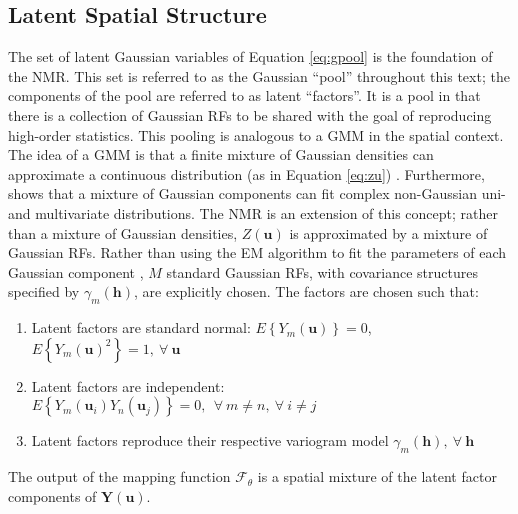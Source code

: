 

\FloatBarrier
\subsection{Latent Spatial Structure}
\label{subsec:03latent}

The set of latent Gaussian variables of Equation \ref{eq:gpool} is the foundation of the \gls{NMR}. This set is referred to as the Gaussian ``pool'' throughout this text; the components of the pool are referred to as latent ``factors''. It is a pool in that there is a collection of Gaussian \glspl{RF} to be shared with the goal of reproducing high-order statistics. This pooling is analogous to a \gls{GMM} in the spatial context. The idea of a \gls{GMM} is that a finite mixture of Gaussian densities can approximate a continuous distribution (as in Equation \ref{eq:zu}) \citep{mclachlan2019finite}. Furthermore, \cite{silva2018multivariate} shows that a mixture of Gaussian components can fit complex non-Gaussian uni- and multivariate distributions. The \gls{NMR} is an extension of this concept; rather than a mixture of Gaussian densities, $Z(\mathbf{u})$ is approximated by a mixture of Gaussian \glspl{RF}. Rather than using the \gls{EM} algorithm to fit the parameters of each Gaussian component \citep{mclachlan2019finite}, $M$ standard Gaussian \glspl{RF}, with covariance structures specified by $\gamma_{m}(\mathbf{h})$, are explicitly chosen. The factors are chosen such that:
\begin{enumerate}[noitemsep]
    \item Latent factors are standard normal: $E\left\{Y_{m}(\mathbf{u})\right\}=0$, \ $E\left\{Y_{m}(\mathbf{u})^{2}\right\}=1, \ \forall \ \mathbf{u}$
    \item Latent factors are independent: $E\left\{Y_{m}(\mathbf{u}_{i})Y_{n}(\mathbf{u}_{j})\right\}=0, \ \ \forall \ m\neq n, \ \forall \ i \neq j$
    \item Latent factors reproduce their respective variogram model $\gamma_m(\mathbf{h}), \ \forall \ \mathbf{h}$
\end{enumerate}
The output of the mapping function $\mathcal{F}_{\theta}$ is a spatial mixture of the latent factor components of $\mathbf{Y}(\mathbf{u})$.

